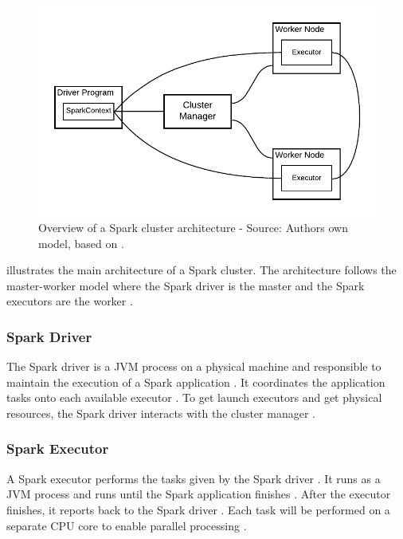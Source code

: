 \begin{figure}[h]
\centering
\includegraphics[scale=1]{images/04_technical_background/spark/spark_cluster_architecture}
\caption{Overview of a Spark cluster architecture - Source: Authors own model, based on \cite{Apache2020Spark}.}
\label{fig:spark_cluster_overview}
\end{figure}

 illustrates the main architecture of a Spark cluster. The architecture follows the master-worker model where the Spark driver is the master and the Spark executors are the worker \cite{Hien2018Spark}.


\subsubsection{Spark Driver}
\label{subsubsec:04_spark_architecture_driver}
The Spark driver is a JVM process on a physical machine and responsible to maintain the execution of a Spark application \cite{Chambers2018Spark}. It coordinates the application tasks onto each available executor \cite{Hien2018Spark}. To get launch executors and get physical resources, the Spark driver interacts with the cluster manager \cite{Chambers2018Spark, Hien2018Spark}.


\subsubsection{Spark Executor}
A Spark executor performs the tasks given by the Spark driver \cite{Chambers2018Spark}. It runs as a JVM process and runs until the Spark application finishes \cite{Hien2018Spark}. After the executor finishes, it reports back to the Spark driver \cite{Chambers2018Spark}. Each task will be performed on a separate CPU core to enable parallel processing  \cite{Hien2018Spark}.


